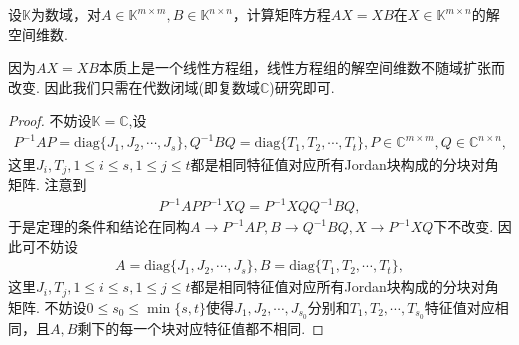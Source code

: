 \documentclass[../../main.tex]{subfiles}%
\begin{document}
\begin{theorem}[交结数定理]\label{theorem:AX-XB相关命题3}
设$\mathbb{K}$为数域，对$A\in\mathbb{K}^{m\times m}, B\in\mathbb{K}^{n\times n}$，计算矩阵方程$AX = XB$在$X\in\mathbb{K}^{m\times n}$的解空间维数.
\end{theorem}
\begin{remark}
因为$AX = XB$本质上是一个线性方程组，线性方程组的解空间维数不随域扩张而改变. 因此我们只需在代数闭域(即复数域$\mathbb{C}$)研究即可.
\end{remark}
\begin{proof}
不妨设$\mathbb{K}=\mathbb{C}$,设
\begin{align*}
P^{-1}AP = \mathrm{diag}\{J_1, J_2, \cdots, J_s\}, Q^{-1}BQ = \mathrm{diag}\{T_1, T_2, \cdots, T_t\}, P\in\mathbb{C}^{m\times m}, Q\in\mathbb{C}^{n\times n},
\end{align*}
这里$J_i, T_j, 1\leqslant i\leqslant s, 1\leqslant j\leqslant t$都是相同特征值对应所有Jordan块构成的分块对角矩阵.
注意到
\begin{align*}
P^{-1}APP^{-1}XQ = P^{-1}XQQ^{-1}BQ,
\end{align*}
于是定理的条件和结论在同构$A\rightarrow P^{-1}AP,B\rightarrow Q^{-1}BQ,X\rightarrow P^{-1}XQ$下不改变. 因此可不妨设
\begin{align*}
A = \mathrm{diag}\{J_1, J_2, \cdots, J_s\}, B = \mathrm{diag}\{T_1, T_2, \cdots, T_t\},
\end{align*}
这里$J_i, T_j, 1\leqslant i\leqslant s, 1\leqslant j\leqslant t$都是相同特征值对应所有Jordan块构成的分块对角矩阵. 不妨设$0\leqslant s_0\leqslant\min\{s, t\}$使得$J_1, J_2, \cdots, J_{s_0}$分别和$T_1, T_2, \cdots, T_{s_0}$特征值对应相同，且$A, B$剩下的每一个块对应特征值都不相同.


\end{proof}
\end{document}
